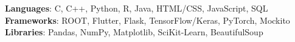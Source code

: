    \begin{itemize}[leftmargin=0.15in, label={}] 
    \small{\item{
      \textbf{Languages}: C, C++, Python, R, Java, HTML/CSS, JavaScript, SQL\\
      \textbf{Frameworks}: ROOT, Flutter, Flask, TensorFlow/Keras, PyTorch, Mockito\\
      \textbf{Libraries}: Pandas, NumPy, Matplotlib, SciKit-Learn, BeautifulSoup
       }}
\end{itemize}